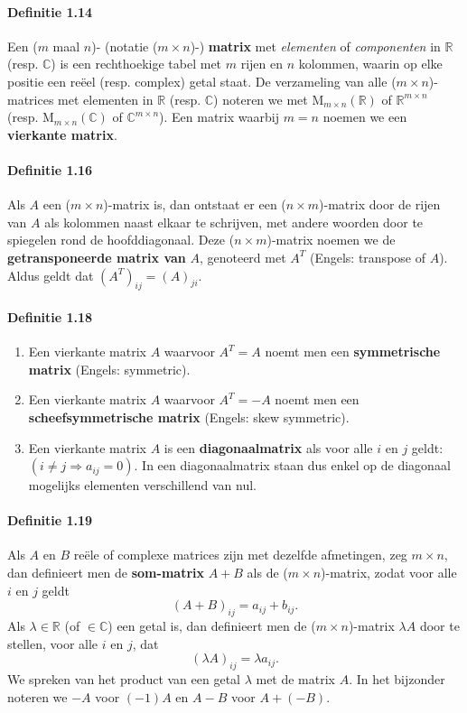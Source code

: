 \documentclass[11pt,oneside,a4paper]{article}
\begin{document}
	\paragraph{Definitie 1.14}
		Een ($m$ maal $n$)- (notatie ($m \times n$)-) \textbf{matrix} met \textit{elementen} of \textit{componenten} in $\mathbb{R}$ (resp. $\mathbb{C}$) is een rechthoekige tabel met $m$ rijen en $n$ kolommen, waarin op elke positie een reëel (resp. complex) getal staat. De verzameling van alle ($m \times n$)-matrices met elementen in $\mathbb{R}$ (resp. $\mathbb{C}$) noteren we met $\text{M}_{m \times n}(\mathbb{R})$ of $\mathbb{R}^{m \times n}$ (resp. $\text{M}_{m \times n}(\mathbb{C})$ of $\mathbb{C}^{m \times n}$). Een matrix waarbij $m=n$ noemen we een \textbf{vierkante matrix}.
	\paragraph{Definitie 1.16}
		Als $A$ een ($m \times n$)-matrix is, dan ontstaat er een ($n \times m$)-matrix door de rijen van $A$ als kolommen naast elkaar te schrijven, met andere woorden door te spiegelen rond de hoofddiagonaal. Deze ($n \times m$)-matrix noemen we de \textbf{getransponeerde matrix van} $A$, genoteerd met $A^T$ (Engels: transpose of $A$). Aldus geldt dat $(A^T)_{ij}=(A)_{ji}$.
	\paragraph{Definitie 1.18}
		\begin{enumerate}
			\item Een vierkante matrix $A$ waarvoor $A^T = A$ noemt men een \textbf{symmetrische matrix} (Engels: symmetric).
			\item Een vierkante matrix $A$ waarvoor $A^T = -A$ noemt men een \textbf{scheefsymmetrische matrix} (Engels: skew symmetric).
			\item Een vierkante matrix $A$ is een \textbf{diagonaalmatrix} als voor alle $i$ en $j$ geldt: $(i \ne j \Rightarrow a_{ij}=0)$. In een diagonaalmatrix staan dus enkel op de diagonaal mogelijks elementen verschillend van nul.
		\end{enumerate}
	\paragraph{Definitie 1.19}
		Als $A$ en $B$ reële of complexe matrices zijn met dezelfde afmetingen, zeg $m \times n$, dan definieert men de \textbf{som-matrix} $A+B$ als de ($m \times n$)-matrix, zodat voor alle $i$ en $j$ geldt $$(A+B)_{ij} = a_{ij} + b_{ij}.$$
		Als $\lambda \in \mathbb{R}$ (of $\in \mathbb{C}$) een getal is, dan definieert men de ($m \times n$)-matrix $\lambda A$ door te stellen, voor alle $i$ en $j$, dat $$(\lambda A)_{ij} = \lambda a_{ij}.$$
		We spreken van het product van een getal $\lambda$ met de matrix $A$. In het bijzonder noteren we $-A$ voor $(-1)A$ en $A-B$ voor $A+(-B)$.
\end{document}
